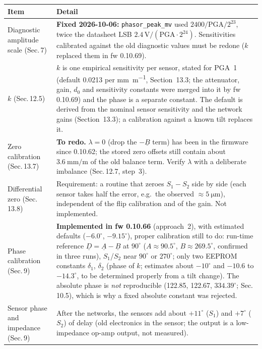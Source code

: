 \documentclass[11pt,a4paper]{article}
\begin{document}
\begin{center}
\small
\begin{tabular}{@{}p{}p{}@{}}
\toprule
Item & Detail \\
\midrule
Diagnostic amplitude scale (Sec.\,7) &
\textbf{Fixed 2026-10-06:} \texttt{phasor\_peak\_mv} used $2400/\text{PGA}/2^{23}$,
twice the datasheet LSB $2.4\,\mathrm{V}/(\text{PGA}\cdot2^{24})$.  Sensitivities
calibrated against the old diagnostic values must be redone ($k$ replaced them in fw 0.10.69). \\
$k$ (Sec.\,12.5) &
$k$ is one empirical sensitivity per sensor, stated for PGA~1 (default 0.0213
per \si{\milli\metre\per\metre}, Section~13.3; the attenuator, gain, $d_0$ and
sensitivity constants were merged into it by fw 0.10.69) and the phase is a separate constant.  The
default is derived from the nominal sensor sensitivity and the network gains
(Section~13.3); a calibration against a known tilt replaces it. \\
Zero calibration (Sec.\,13.7) &
\textbf{To redo.}  $\lambda=0$ (drop the $-\underline{B}$ term) has been in
the firmware since 0.10.62; the stored zero offsets still contain about
$\SI{3.6}{\milli\metre\per\metre}$ of the old balance term.  Verify
$\lambda$ with a deliberate imbalance (Sec.\,12.7, step~3). \\
Differential zero (Sec.\,13.8) &
Requirement: a routine that zeroes $S_1-S_2$ side by side (each sensor takes
half the error, e.g.\ the observed $\approx\SI{5}{\micro\metre}$), independent
of the flip calibration and of the gain.  Not implemented. \\
Phase calibration (Sec.\,9) &
\textbf{Implemented in fw 0.10.66} (approach~2), with estimated defaults
($-6.0^\circ$, $-9.15^\circ$), proper calibration still to do: run-time reference
$\underline{D}=\underline{A}-\underline{B}$ at $90^\circ$ ($A\approx90.5^\circ$,
$B\approx269.5^\circ$, confirmed in three runs), $S_1$/$S_2$ near $90^\circ$
or $270^\circ$; only two EEPROM constants $\delta_1$, $\delta_2$ (phase of
$k$; estimates about $-10^\circ$ and $-10.6$ to $-14.3^\circ$, to be determined
properly from a tilt change).  The absolute phase is \emph{not} reproducible
(122.85, 122.67, $334.39^\circ$; Sec.\,10.5), which is why a fixed absolute
constant was rejected. \\
Sensor phase and impedance (Sec.\,9) &
After the networks, the sensors add about $+11^\circ$ ($S_1$) and
$+7^\circ$ ($S_2$) of delay (old electronics in the sensor; the output is a
low-impedance op-amp output, not measured). \\

\end{tabular}
\end{center}
\end{document}
